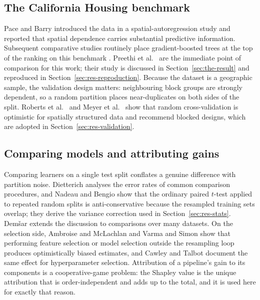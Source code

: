 \documentclass[pdflatex,sn-mathphys-num]{sn-jnl}
\begin{document}
\subsection{The California Housing benchmark}\label{sec:rw-benchmark}
Pace and Barry \cite{pace1997} introduced the data in a spatial-autoregression study and reported that spatial dependence carries substantial predictive information. Subsequent comparative studies routinely place gradient-boosted trees at the top of the ranking on this benchmark \cite{chen2016}. Preethi et al.\ \cite{preethi2025} are the immediate point of comparison for this work; their study is discussed in Section~\ref{sec:the-result} and reproduced in Section~\ref{sec:res-reproduction}. Because the dataset is a geographic sample, the validation design matters: neighbouring block groups are strongly dependent, so a random partition places near-duplicates on both sides of the split. Roberts et al.\ \cite{roberts2017} and Meyer et al.\ \cite{meyer2018} show that random cross-validation is optimistic for spatially structured data and recommend blocked designs, which are adopted in Section~\ref{sec:res-validation}.

\subsection{Comparing models and attributing gains}\label{sec:rw-compare}
Comparing learners on a single test split conflates a genuine difference with partition noise. Dietterich \cite{dietterich1998} analyses the error rates of common comparison procedures, and Nadeau and Bengio \cite{nadeau2003} show that the ordinary paired $t$-test applied to repeated random splits is anti-conservative because the resampled training sets overlap; they derive the variance correction used in Section~\ref{sec:res-stats}. Dem\v{s}ar \cite{demsar2006} extends the discussion to comparisons over many datasets. On the selection side, Ambroise and McLachlan \cite{ambroise2002} and Varma and Simon \cite{varma2006} show that performing feature selection or model selection outside the resampling loop produces optimistically biased estimates, and Cawley and Talbot \cite{cawley2010} document the same effect for hyperparameter selection. Attribution of a pipeline's gain to its components is a cooperative-game problem: the Shapley value \cite{shapley1953} is the unique attribution that is order-independent and adds up to the total, and it is used here for exactly that reason.

\end{document}
